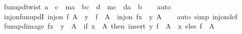 \begin{isabellebody}
\ fun{\isacharunderscore}{\kern0pt}upd{\isacharunderscore}{\kern0pt}twist{\isacharcolon}{\kern0pt}\ {\isachardoublequoteopen}a\ {\isasymnoteq}\ c\ {\isasymLongrightarrow}\ {\isacharparenleft}{\kern0pt}m{\isacharparenleft}{\kern0pt}a\ {\isacharcolon}{\kern0pt}{\isacharequal}{\kern0pt}\ b{\isacharparenright}{\kern0pt}{\isacharparenright}{\kern0pt}{\isacharparenleft}{\kern0pt}c\ {\isacharcolon}{\kern0pt}{\isacharequal}{\kern0pt}\ d{\isacharparenright}{\kern0pt}\ {\isacharequal}{\kern0pt}\ {\isacharparenleft}{\kern0pt}m{\isacharparenleft}{\kern0pt}c\ {\isacharcolon}{\kern0pt}{\isacharequal}{\kern0pt}\ d{\isacharparenright}{\kern0pt}{\isacharparenright}{\kern0pt}{\isacharparenleft}{\kern0pt}a\ {\isacharcolon}{\kern0pt}{\isacharequal}{\kern0pt}\ b{\isacharparenright}{\kern0pt}{\isachardoublequoteclose}\isanewline
%
\isadelimproof
\ \ %
\endisadelimproof
%
\isatagproof
{}\isamarkupfalse%
\ auto%
\endisatagproof
{\isafoldproof}%
%
\isadelimproof
\isanewline
%
\endisadelimproof
\isanewline
{}\isamarkupfalse%
\ inj{\isacharunderscore}{\kern0pt}on{\isacharunderscore}{\kern0pt}fun{\isacharunderscore}{\kern0pt}updI{\isacharcolon}{\kern0pt}\ {\isachardoublequoteopen}inj{\isacharunderscore}{\kern0pt}on\ f\ A\ {\isasymLongrightarrow}\ y\ {\isasymnotin}\ f\ {\isacharbackquote}{\kern0pt}\ A\ {\isasymLongrightarrow}\ inj{\isacharunderscore}{\kern0pt}on\ {\isacharparenleft}{\kern0pt}f{\isacharparenleft}{\kern0pt}x\ {\isacharcolon}{\kern0pt}{\isacharequal}{\kern0pt}\ y{\isacharparenright}{\kern0pt}{\isacharparenright}{\kern0pt}\ A{\isachardoublequoteclose}\isanewline
%
\isadelimproof
\ \ %
\endisadelimproof
%
\isatagproof
{}\isamarkupfalse%
\ {\isacharparenleft}{\kern0pt}auto\ simp{\isacharcolon}{\kern0pt}\ inj{\isacharunderscore}{\kern0pt}on{\isacharunderscore}{\kern0pt}def{\isacharparenright}{\kern0pt}%
\endisatagproof
{\isafoldproof}%
%
\isadelimproof
\isanewline
%
\endisadelimproof
\isanewline
{}\isamarkupfalse%
\ fun{\isacharunderscore}{\kern0pt}upd{\isacharunderscore}{\kern0pt}image{\isacharcolon}{\kern0pt}\ {\isachardoublequoteopen}f{\isacharparenleft}{\kern0pt}x\ {\isacharcolon}{\kern0pt}{\isacharequal}{\kern0pt}\ y{\isacharparenright}{\kern0pt}\ {\isacharbackquote}{\kern0pt}\ A\ {\isacharequal}{\kern0pt}\ {\isacharparenleft}{\kern0pt}if\ x\ {\isasymin}\ A\ then\ insert\ y\ {\isacharparenleft}{\kern0pt}f\ {\isacharbackquote}{\kern0pt}\ {\isacharparenleft}{\kern0pt}A\ {\isacharminus}{\kern0pt}\ {\isacharbraceleft}{\kern0pt}x{\isacharbraceright}{\kern0pt}{\isacharparenright}{\kern0pt}{\isacharparenright}{\kern0pt}\ else\ f\ {\isacharbackquote}{\kern0pt}\ A{\isacharparenright}{\kern0pt}{\isachardoublequoteclose}\isanewline

\end{isabellebody}
